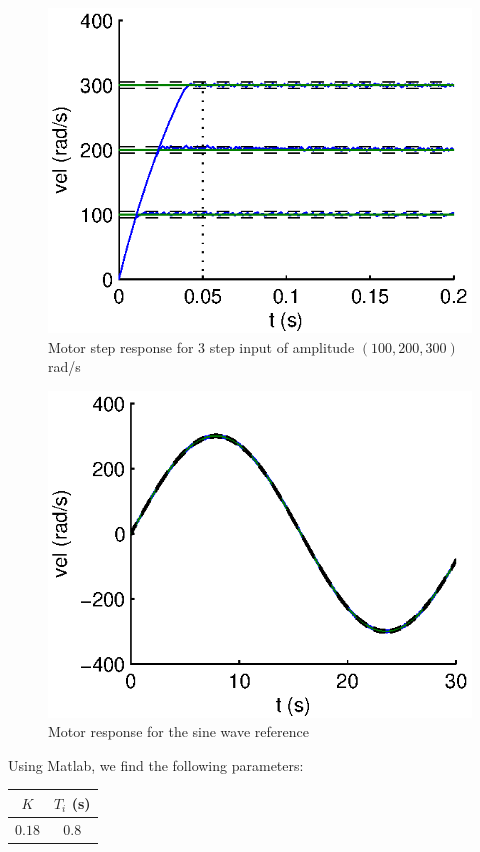 \begin{center}
\begin{figure}[h]
 \includegraphics[width=\linewidth]{fig/StepPIspeed.eps}
 \caption{Motor step response for 3 step input of amplitude $(100,200,300)$ rad/s}
 \label{stepPIspeed}
\end{figure}
\end{center}

\begin{center}
\begin{figure}[h]
 \includegraphics[width=\linewidth]{fig/SinPIspeed.eps}
 \caption{Motor response for the sine wave reference}
 \label{sinPIspeed}
\end{figure}
\end{center}


Using Matlab, we find the following parameters:
\begin{center}
 \begin{tabular}{|c|c|}
 \hline
 $K$ & $T_i$ (s) \\
 \hline
 $0.18$ & $0.8$ \\
 \hline
 \end{tabular}
\end{center}